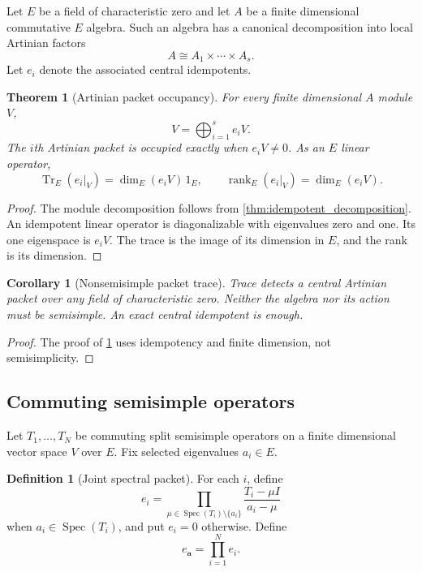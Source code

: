 \documentclass{aomart}
\newtheorem{theorem}{Theorem}[section]
\newtheorem{corollary}[corollary]{Corollary}
\theoremstyle{definition}
\newtheorem{definition}[definition]{Definition}
\theoremstyle{remark}
\newcommand{\Spec}{\operatorname{Spec}}
\newcommand{\rank}{\operatorname{rank}}
\newcommand{\Tr}{\operatorname{Tr}}
\begin{document}
Let \(E\) be a field of characteristic zero and let \(A\) be a finite dimensional commutative \(E\) algebra. Such an algebra has a canonical decomposition into local Artinian factors
\[
A
\cong
A_1\times\cdots\times A_s.
\]
Let \(e_i\) denote the associated central idempotents.

\begin{theorem}[Artinian packet occupancy]\label{thm:artinian_occupancy}
For every finite dimensional \(A\) module \(V\),
\[
\boxed{
V
=
\bigoplus_{i=1}^{s}e_iV.
}
\]
The \(i\)th Artinian packet is occupied exactly when \(e_iV\neq0\). As an \(E\) linear operator,
\[
\boxed{
\Tr_E(e_i|_V)
=
\dim_E(e_iV)\,1_E,
\qquad
\rank_E(e_i|_V)
=
\dim_E(e_iV).
}
\]
\end{theorem}

\begin{proof}
The module decomposition follows from \cref{thm:idempotent_decomposition}. An idempotent linear operator is diagonalizable with eigenvalues zero and one. Its one eigenspace is \(e_iV\). The trace is the image of its dimension in \(E\), and the rank is its dimension.
\end{proof}

\begin{corollary}[Nonsemisimple packet trace]\label{cor:nonsemisimple_packet_trace}
Trace detects a central Artinian packet over any field of characteristic zero. Neither the algebra nor its action must be semisimple. An exact central idempotent is enough.
\end{corollary}

\begin{proof}
The proof of \cref{thm:artinian_occupancy} uses idempotency and finite dimension, not semisimplicity.
\end{proof}

\subsection{Commuting semisimple operators}

Let \(T_1,\ldots,T_N\) be commuting split semisimple operators on a finite dimensional vector space \(V\) over \(E\). Fix selected eigenvalues \(a_i\in E\).

\begin{definition}[Joint spectral packet]\label{def:joint_spectral_packet}
For each \(i\), define
\[
e_i
=
\prod_{\mu\in\Spec(T_i)\setminus\{a_i\}}
\frac{T_i-\mu I}{a_i-\mu}
\]
when \(a_i\in\Spec(T_i)\), and put \(e_i=0\) otherwise. Define
\[
e_{\bm a}
=
\prod_{i=1}^{N}e_i.
\]
\end{definition}
\end{document}
